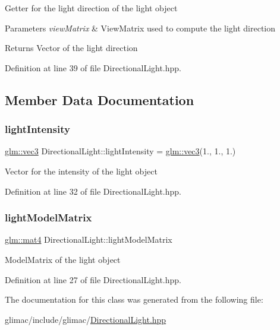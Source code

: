 Getter for the light direction of the light object 
\begin{DoxyParams}{Parameters}
{\em view\+Matrix} & View\+Matrix used to compute the light direction \\
\hline
\end{DoxyParams}
\begin{DoxyReturn}{Returns}
Vector of the light direction 
\end{DoxyReturn}


Definition at line 39 of file Directional\+Light.\+hpp.



\subsection{Member Data Documentation}
\mbox{\label{class_directional_light_a0775cb1480596c0f38f09b996a4808ee}} 
\subsubsection{\texorpdfstring{light\+Intensity}{lightIntensity}}
{\footnotesize\ttfamily \hyperlink{group__core__types_ga1c47e8b3386109bc992b6c48e91b0be7}{glm\+::vec3} Directional\+Light\+::light\+Intensity = \hyperlink{group__core__types_ga1c47e8b3386109bc992b6c48e91b0be7}{glm\+::vec3}(1., 1., 1.)}

Vector for the intensity of the light object 

Definition at line 32 of file Directional\+Light.\+hpp.

\mbox{\label{class_directional_light_a7c01eb7c4d273af7e8b683e0f909e334}} 
\subsubsection{\texorpdfstring{light\+Model\+Matrix}{lightModelMatrix}}
{\footnotesize\ttfamily \hyperlink{group__core__types_ga7dcd2365c2e368e6af5b7adeb6a9c8df}{glm\+::mat4} Directional\+Light\+::light\+Model\+Matrix}

Model\+Matrix of the light object 

Definition at line 27 of file Directional\+Light.\+hpp.



The documentation for this class was generated from the following file\+:\begin{DoxyCompactItemize}
\item 
glimac/include/glimac/\hyperlink{_directional_light_8hpp}{Directional\+Light.\+hpp}\end{DoxyCompactItemize}
